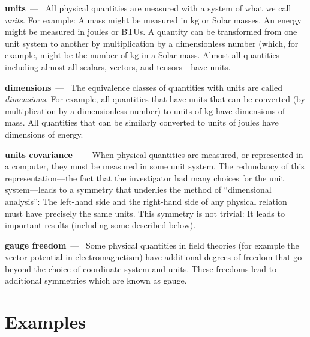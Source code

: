 \documentclass{article}
\newcommand{\unit}[1]{\mathrm{#1}}
\newcommand{\kg}{\unit{kg}}
\renewcommand{\paragraph}[1]{\par\textbf{#1}~---~}
\begin{document}
\paragraph{units} All physical quantities are measured with a system of what we call \emph{units}.
For example: A mass might be measured in $\kg$ or Solar masses.
An energy might be measured in joules or BTUs.
A quantity can be transformed from one unit system to another by multiplication by a dimensionless number (which, for example, might be the number of $\kg$ in a Solar mass.
Almost all quantities---including almost all scalars, vectors, and tensors---have units.

\paragraph{dimensions} The equivalence classes of quantities with units are called \emph{dimensions}.
For example, all quantities that have units that can be converted (by multiplication by a dimensionless number) to units of $\kg$ have dimensions of mass.
All quantities that can be similarly converted to units of joules have dimensions of energy.

\paragraph{units covariance} When physical quantities are measured, or represented in a computer, they must be measured in some unit system.
The redundancy of this representation---the fact that the investigator had many choices for the unit system---leads to a symmetry that underlies the method of ``dimensional analysis'':
The left-hand side and the right-hand side of any physical relation must have precisely the same units.
This symmetry is not trivial: It leads to important results (including some described below).

\paragraph{gauge freedom}
Some physical quantities in field theories (for example the vector potential in electromagnetism) have additional degrees of freedom that go beyond the choice of coordinate system and units.
These freedoms lead to additional symmetries which are known as gauge.

\section{Examples}
\end{document}

